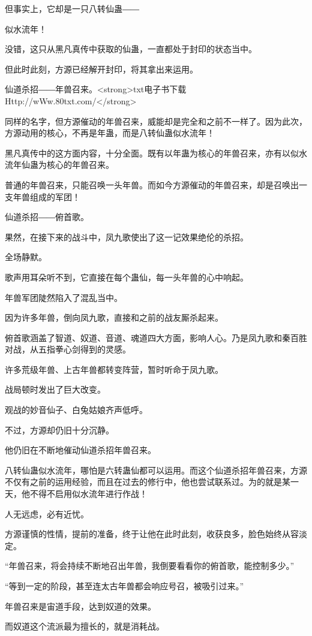 \begin{this_body}
但事实上，它却是一只八转仙蛊――

似水流年！

没错，这只从黑凡真传中获取的仙蛊，一直都处于封印的状态当中。

但此时此刻，方源已经解开封印，将其拿出来运用。

仙道杀招――年兽召来。<strong>txt电子书下载Http://wWw.80txt.com/</strong>

同样的名字，但方源催动的年兽召来，威能却是完全和之前不一样了。因为此次，方源动用的核心，不再是年蛊，而是八转仙蛊似水流年！

黑凡真传中的这方面内容，十分全面。既有以年蛊为核心的年兽召来，亦有以似水流年仙蛊为核心的年兽召来。

普通的年兽召来，只能召唤一头年兽。而如今方源催动的年兽召来，却是召唤出一支年兽组成的军团！

仙道杀招――俯首歌。

果然，在接下来的战斗中，凤九歌使出了这一记效果绝伦的杀招。

全场静默。

歌声用耳朵听不到，它直接在每个蛊仙，每一头年兽的心中响起。

年兽军团陡然陷入了混乱当中。

因为许多年兽，倒向凤九歌，直接和之前的战友厮杀起来。

俯首歌涵盖了智道、奴道、音道、魂道四大方面，影响人心。乃是凤九歌和秦百胜对战，从五指拳心剑得到的灵感。

许多荒级年兽、上古年兽都转变阵营，暂时听命于凤九歌。

战局顿时发出了巨大改变。

观战的妙音仙子、白兔姑娘齐声低呼。

不过，方源却仍旧十分沉静。

他仍旧在不断地催动仙道杀招年兽召来。

八转仙蛊似水流年，哪怕是六转蛊仙都可以运用。而这个仙道杀招年兽召来，方源不仅有之前的运用经验，而且在过去的修行中，他也尝试联系过。为的就是某一天，他不得不启用似水流年进行作战！

人无远虑，必有近忧。

方源谨慎的性情，提前的准备，终于让他在此时此刻，收获良多，脸色始终从容淡定。

“年兽召来，将会持续不断地召出年兽，我倒要看看你的俯首歌，能控制多少。”

“等到一定的阶段，甚至连太古年兽都会响应号召，被吸引过来。”

年兽召来是宙道手段，达到奴道的效果。

而奴道这个流派最为擅长的，就是消耗战。


\end{this_body}
